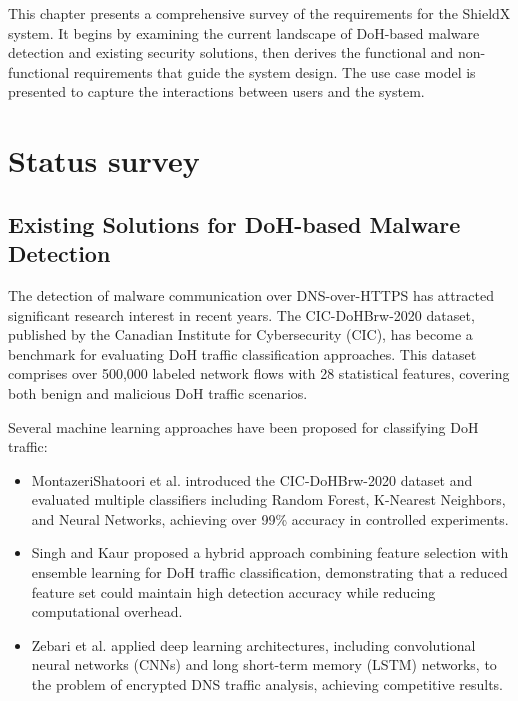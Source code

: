 \documentclass[../Main.tex]{subfiles}
\begin{document}
This chapter presents a comprehensive survey of the requirements for the ShieldX system. It begins by examining the current landscape of DoH-based malware detection and existing security solutions, then derives the functional and non-functional requirements that guide the system design. The use case model is presented to capture the interactions between users and the system.

\section{Status survey}
\label{section:2.1}

\subsection{Existing Solutions for DoH-based Malware Detection}

The detection of malware communication over DNS-over-HTTPS has attracted significant research interest in recent years. The CIC-DoHBrw-2020 dataset, published by the Canadian Institute for Cybersecurity (CIC), has become a benchmark for evaluating DoH traffic classification approaches. This dataset comprises over 500,000 labeled network flows with 28 statistical features, covering both benign and malicious DoH traffic scenarios.

Several machine learning approaches have been proposed for classifying DoH traffic:
\begin{itemize}
    \item MontazeriShatoori et al. \cite{montazeri2020doh} introduced the CIC-DoHBrw-2020 dataset and evaluated multiple classifiers including Random Forest, K-Nearest Neighbors, and Neural Networks, achieving over 99\% accuracy in controlled experiments.
    \item Singh and Kaur \cite{singh2022doh} proposed a hybrid approach combining feature selection with ensemble learning for DoH traffic classification, demonstrating that a reduced feature set could maintain high detection accuracy while reducing computational overhead.
    \item Zebari et al. \cite{zebari2023doh} applied deep learning architectures, including convolutional neural networks (CNNs) and long short-term memory (LSTM) networks, to the problem of encrypted DNS traffic analysis, achieving competitive results.
\end{itemize}
\end{document}
